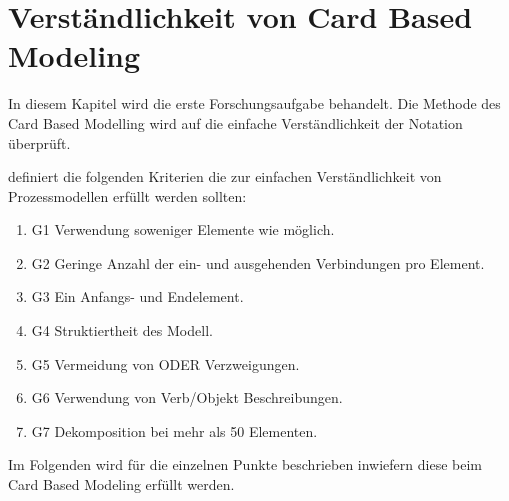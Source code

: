 %
%
% 
% 
% 


\chapter{Verständlichkeit von Card Based Modeling}
\label{chap:Empfehlungen}
In diesem Kapitel wird die erste Forschungsaufgabe behandelt. Die Methode des Card Based Modelling \citep{Oppl:2015:ASB:2723839.2723841} wird auf die einfache Verständlichkeit der Notation überprüft.

\citeauthor{MENDLING2010127} definiert die folgenden Kriterien die zur einfachen Verständlichkeit von Prozessmodellen erfüllt werden sollten:
\begin{enumerate}
	\item G1 Verwendung soweniger Elemente wie möglich.
	\item G2 Geringe Anzahl der ein- und ausgehenden Verbindungen pro Element.
	\item G3 Ein Anfangs- und Endelement.
	\item G4 Struktiertheit des Modell.
	\item G5 Vermeidung von ODER Verzweigungen.
	\item G6 Verwendung von Verb/Objekt Beschreibungen.
	\item G7 Dekomposition bei mehr als 50 Elementen.\citep{MENDLING2010127}
\end{enumerate}

Im Folgenden wird für die einzelnen Punkte beschrieben inwiefern diese beim Card Based Modeling erfüllt werden.

